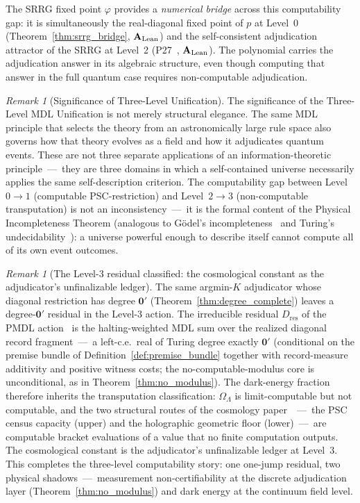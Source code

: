 \documentclass[11pt]{article}
\theoremstyle{remark}
\newtheorem{remark}[theorem]{Remark}
\newcommand{\CatAL}{\ensuremath{\textbf{A}_{\rm Lean}}}
\begin{document}
The SRRG fixed point $\varphi$ provides a \emph{numerical bridge} across
this computability gap: it is simultaneously the real-diagonal fixed point
of $p$ at Level~0 (Theorem~\ref{thm:srrg_bridge}, \CatAL) and the
self-consistent adjudication attractor of the SRRG at Level~2
(P27~\cite{SpivackSRRG}, \CatAL). The polynomial carries the adjudication
answer in its algebraic structure, even though computing that answer in the
full quantum case requires non-computable adjudication.

\begin{remark}[Significance of Three-Level Unification]
The significance of the Three-Level MDL Unification is not merely structural
elegance.
The same MDL principle that selects the theory from an astronomically large
rule space also governs how that theory evolves as a field and how it
adjudicates quantum events.
These are not three separate applications of an information-theoretic
principle~---~they are three domains in which a self-contained universe
necessarily applies the same self-description criterion.
The computability gap between Level~$0\to1$ (computable PSC-restriction) and
Level~$2\to3$ (non-computable transputation) is not an inconsistency~---~it
is the formal content of the Physical Incompleteness Theorem (analogous to
G\"{o}del's incompleteness~\cite{Godel1931} and Turing's
undecidability~\cite{Turing1936}): a universe powerful enough to describe
itself cannot compute all of its own event outcomes.
\end{remark}

\begin{remark}[The Level-3 residual classified: the cosmological constant
  as the adjudicator's unfinalizable ledger]
\label{rem:level3_residual}
The same argmin-$K$ adjudicator whose diagonal restriction has degree
$\mathbf{0}'$ (Theorem~\ref{thm:degree_complete}) leaves a
degree-$\mathbf{0}'$ residual in the Level-3 action. The irreducible
residual $D_{\mathrm{res}}$ of the PMDL
action~\cite{SpivackGTEPolynomialUFT} is the halting-weighted MDL sum over
the realized diagonal record fragment~---~a left-c.e.\ real of Turing
degree exactly $\mathbf{0}'$ (conditional on the premise bundle of
Definition~\ref{def:premise_bundle} together with record-measure
additivity and positive witness costs; the no-computable-modulus core is
unconditional, as in Theorem~\ref{thm:no_modulus}).
The dark-energy fraction therefore inherits the transputation
classification: $\Omega_\Lambda$ is limit-computable but not computable,
and the two structural routes of the cosmology
paper~\cite{SpivackGTECosmology}~---~the PSC census capacity (upper) and
the holographic geometric floor (lower)~---~are computable bracket
evaluations of a value that no finite computation outputs.
The cosmological constant is the adjudicator's unfinalizable ledger at
Level~3.
This completes the three-level computability story: one one-jump residual,
two physical shadows~---~measurement non-certifiability at the discrete
adjudication layer (Theorem~\ref{thm:no_modulus}) and dark energy at the
continuum field level.
\end{remark}
\end{document}
